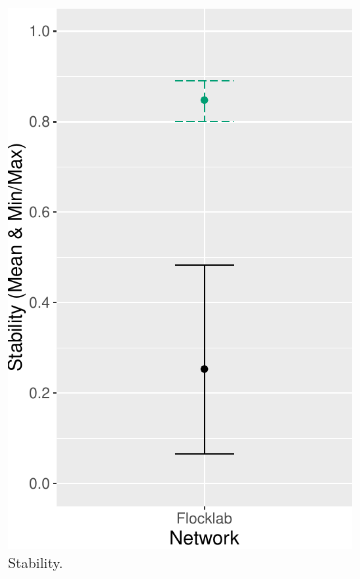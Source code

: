 \begin{figure}[bt]
\begin{subfigure}{0.24\textwidth}
        \includegraphics[width=\textwidth, keepaspectratio]{figure/Results/ChaosComparison/Flocklab/FlocklabComparison_Stability.pdf}
        \caption{Stability.}
        \label{subfig:flocklab-stability}
    \end{subfigure}
    \begin{subfigure}{0.24\textwidth}
        \centering

\end{subfigure}
\end{figure}
